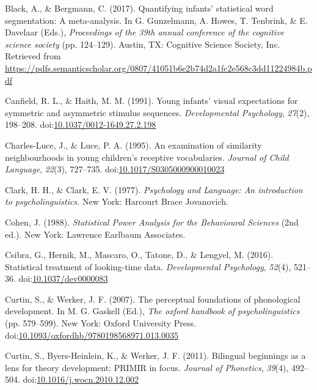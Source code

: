\documentclass[man]{apa6}
\theoremstyle{definition}
\theoremstyle{definition}
\theoremstyle{definition}
\theoremstyle{remark}
\begin{document}
\hypertarget{ref-Black2017}{}
Black, A., \& Bergmann, C. (2017). Quantifying infants' statistical word
segmentation: A meta-analysis. In G. Gunzelmann, A. Howes, T. Tenbrink,
\& E. Davelaar (Eds.), \emph{Proceedings of the 39th annual conference
of the cognitive science society} (pp. 124--129). Austin, TX: Cognitive
Science Society, Inc. Retrieved from
\url{https://pdfs.semanticscholar.org/0807/41051b6e2b74d2a1fc2e568c3dd11224984b.pdf}

\hypertarget{ref-Canfield1991}{}
Canfield, R. L., \& Haith, M. M. (1991). Young infants' visual
expectations for symmetric and asymmetric stimulus sequences.
\emph{Developmental Psychology}, \emph{27}(2), 198--208.
doi:\href{https://doi.org/10.1037/0012-1649.27.2.198}{10.1037/0012-1649.27.2.198}

\hypertarget{ref-CharlesLuce1995}{}
Charles-Luce, J., \& Luce, P. A. (1995). An examination of similarity
neighbourhoods in young children's receptive vocabularies. \emph{Journal
of Child Language}, \emph{22}(3), 727--735.
doi:\href{https://doi.org/10.1017/S0305000900010023}{10.1017/S0305000900010023}

\hypertarget{ref-clark1977}{}
Clark, H. H., \& Clark, E. V. (1977). \emph{Psychology and Language: An
introduction to psycholinguistics.} New York: Harcourt Brace Jovanovich.

\hypertarget{ref-cohen}{}
Cohen, J. (1988). \emph{Statistical Power Analysis for the Behavioural
Sciences} (2nd ed.). New York: Lawrence Earlbaum Associates.

\hypertarget{ref-Csibra2016}{}
Csibra, G., Hernik, M., Mascaro, O., Tatone, D., \& Lengyel, M. (2016).
Statistical treatment of looking-time data. \emph{Developmental
Psychology}, \emph{52}(4), 521--36.
doi:\href{https://doi.org/10.1037/dev0000083}{10.1037/dev0000083}

\hypertarget{ref-Curtin2007}{}
Curtin, S., \& Werker, J. F. (2007). The perceptual foundations of
phonological development. In M. G. Gaskell (Ed.), \emph{The oxford
handbook of psycholinguistics} (pp. 579--599). New York: Oxford
University Press.
doi:\href{https://doi.org/10.1093/oxfordhb/9780198568971.013.0035}{10.1093/oxfordhb/9780198568971.013.0035}

\hypertarget{ref-Curtin2011}{}
Curtin, S., Byers-Heinlein, K., \& Werker, J. F. (2011). Bilingual
beginnings as a lens for theory development: PRIMIR in focus.
\emph{Journal of Phonetics}, \emph{39}(4), 492--504.
doi:\href{https://doi.org/10.1016/j.wocn.2010.12.002}{10.1016/j.wocn.2010.12.002}
\end{document}
